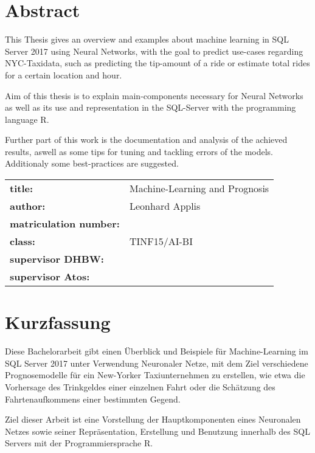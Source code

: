 \chapter*{Abstract} %
This Thesis gives an overview and examples about machine learning in SQL Server 2017 using Neural Networks, with the goal to predict use-cases regarding NYC-Taxidata, such as predicting the tip-amount of a ride or estimate total rides for a certain location and hour.  

Aim of this thesis is to explain main-components necessary for Neural Networks as well as its use and representation in the SQL-Server with the programming language R. 

Further part of this work is the documentation and analysis of the achieved results, aswell as some tips for tuning and tackling errors of the models. Additionaly some best-practices are suggested.
~\newline
~\newline
\begin{flushleft}
	\begin{tabular}{ll}
		\textbf{title:} &\quad Machine-Learning and Prognosis \\
		\textbf{author:}  &\quad Leonhard Applis \\
		\textbf{matriculation number:} &\quad 2086307 \\
		\textbf{class:} &\quad TINF15/AI-BI \\
		\textbf{supervisor DHBW:} &\quad \betreuerdhbw \\
		\textbf{supervisor Atos:} & \quad \betreuerfirma \\
		[6ex]%
	\end{tabular} 
\end{flushleft}


\chapter*{Kurzfassung} 
Diese Bachelorarbeit gibt einen Überblick und Beispiele für Machine-Learning im SQL Server 2017 unter Verwendung Neuronaler Netze, mit dem Ziel verschiedene Prognosemodelle für ein New-Yorker Taxiunternehmen zu erstellen, wie etwa die Vorhersage des Trinkgeldes einer einzelnen Fahrt oder die Schätzung des Fahrtenaufkommens einer bestimmten Gegend. 

Ziel dieser Arbeit ist eine Vorstellung der Hauptkomponenten eines Neuronalen Netzes sowie seiner Repräsentation, Erstellung und Benutzung innerhalb des SQL Servers mit der Programmiersprache R.  

